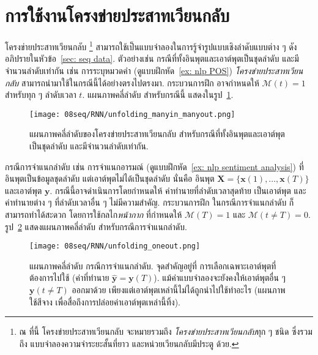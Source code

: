 \section{การใช้งานโครงข่ายประสาทเวียนกลับ}
\label{sec: RNN configurations}
โครงข่ายประสาทเวียนกลับ%
\footnote{%
ณ ที่นี้	
โครงข่ายประสาทเวียนกลับ จะหมายรวมถึง
\textit{โครงข่ายประสาทเวียนกลับ}ทุก ๆ ชนิด
ซึ่งรวมถึง แบบจำลองความจำระยะสั้นที่ยาว และหน่วยเวียนกลับมีประตู ด้วย.
}	
 สามารถใช้เป็นแบบจำลองในการรู้จำรูปแบบเชิงลำดับแบบต่าง ๆ ดังอภิปรายในหัวข้อ~\ref{sec: seq data}.
ตัวอย่างเช่น
กรณีที่ทั้งอินพุตและเอาต์พุตเป็นชุดลำดับ และมีจำนวนลำดับเท่ากัน เช่น การระบุหมวดคำ 
(ดูแบบฝึกหัด~\ref{ex: nlp POS})
\textit{โครงข่ายประสาทเวียนกลับ} สามารถนำมาใช้ในกรณีนี้ได้อย่างตรงไปตรงมา.
กระบวนการฝึก อาจกำหนดให้ $\mathcal{M}(t) = 1$ สำหรับทุก ๆ ลำดับเวลา $t$.
แผนภาพคลี่ลำดับ สำหรับกรณีนี้ แสดงในรูป~\ref{fig: rnn unfolding diagram many to many}.

\begin{figure}
	\begin{center}		
		\texttt{[image: 08seq/RNN/unfolding\_manyin\_manyout.png]}	
		\caption[แผนภาพคลี่ลำดับ กรณีที่ทั้งอินพุตและเอาต์พุตเป็นชุดลำดับ]{แผนภาพคลี่ลำดับของโครงข่ายประสาทเวียนกลับ สำหรับกรณีที่ทั้งอินพุตและเอาต์พุตเป็นชุดลำดับ และมีจำนวนลำดับเท่ากัน.		
		}
		\label{fig: rnn unfolding diagram many to many}
	\end{center}
\end{figure}
%

กรณีการจำแนกลำดับ เช่น การจำแนกอารมณ์ (ดูแบบฝึกหัด~\ref{ex: nlp sentiment analysis})
ที่อินพุตเป็นข้อมูลชุดลำดับ แต่เอาต์พุตไม่ได้เป็นชุดลำดับ
นั่นคือ อินพุต $\bm{X} =\{\bm{x}(1), \ldots, \bm{x}(T)\}$ และเอาต์พุต $\bm{y}$.
กรณีนี้อาจดำเนินการโดยกำหนดให้ ค่าทำนายที่ลำดับเวลาสุดท้าย เป็นเอาต์พุต และค่าทำนายต่าง ๆ ที่ลำดับเวลาอื่น ๆ ไม่มีความสำคัญ.
กระบวนการฝึก ในกรณีการจำแนกลำดับ ก็สามารถทำได้สะดวก โดยการใช้กลไก\textit{หน้ากาก} ที่กำหนดให้ $\mathcal{M}(T) = 1$ และ $\mathcal{M}(t \neq T) = 0$. 
รูป~\ref{fig: rnn unfolding diagram seq classification} แสดงแผนภาพคลี่ลำดับ สำหรับกรณีการจำแนกลำดับ.

\begin{figure}
	\begin{center}		
		\texttt{[image: 08seq/RNN/unfolding\_oneout.png]}	
		\caption[แผนภาพคลี่ลำดับของโครงข่ายประสาทเวียนกลับ กรณีการจำแนกลำดับ]{แผนภาพคลี่ลำดับ กรณีการจำแนกลำดับ.
			จุดสำคัญอยู่ที่ การเลือกเฉพาะเอาต์พุตที่ต้องการไปใช้ (ค่าที่ทำนาย $\hat{\bm{y}} = \bm{y}(T)$).
			แม้ค่าแบบจำลองจะยังคงให้เอาต์พุตอื่น ๆ $\bm{y}(t \neq T)$ ออกมาด้วย เพียงแต่เอาต์พุตเหล่านี้ไม่ได้ถูกนำไปใช้ทำอะไร (แผนภาพใช้สีจาง เพื่อสื่อถึงการปล่อยค่าเอาต์พุตเหล่านี้ทิ้ง).
		}
		\label{fig: rnn unfolding diagram seq classification}
	\end{center}
\end{figure}
%

